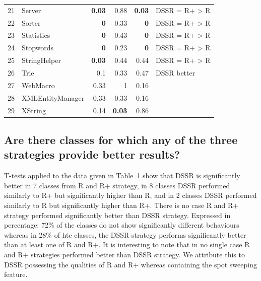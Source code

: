 \documentclass[conference]{IEEEtran}
\begin{document}
\begin{table}[htp]
\begin{tabular}{rlrrrl}
21		&	Server			&	\textbf{0.03}		& 0.88		&\textbf{0.03} 	& DSSR = R+ > R \\
22		&	Sorter			& 	\textbf{0}			& 0.33		&\textbf{0}		& DSSR = R+ > R \\
23		&	Statistics			&	\textbf{0}			& 0.43		&\textbf{0}		& DSSR = R+ > R\\
24		&	Stopwords		&	\textbf{0}			& 0.23		&\textbf{0}		& DSSR = R+ > R \\
25		&	StringHelper		&	\textbf{0.03}		& 0.44		&0.44		& DSSR = R+ > R\\
26		& 	Trie				&	0.1				& 0.33		&0.47		& DSSR better \\
27		&	WebMacro		&	0.33				& 1			&0.16		& \\
28		&	XMLEntityManager	&	0.33				& 0.33		&0.16		& \\
29 		&	XString			&	0.14				&\textbf{0.03}	&0.86		& \\


\end{tabular}
\bigskip
\label{table:ttest}
\end{table}





\subsection{Are there classes for which any of the three strategies provide better results?}


T-tests applied to the data given in Table~\ref{table:ttest} show that DSSR is significantly better in 7 classes from R and R+ strategy, in 8 classes DSSR performed similarly to R+  but significantly higher than R, and in 2 classes DSSR performed similarly to R but significantly higher than R+. There is no case R and R+ strategy performed significantly better than DSSR strategy. Expressed in percentage: 72\%  of the classes do not show significantly different behaviours whereas in 28\% of hte classes, the DSSR strategy performs significantly better than at least one of R and R+. It is interesting to note that in no single case R and R+ strategies performed better than DSSR strategy. We attribute this to DSSR possessing the qualities of R and R+ whereas containing the spot sweeping feature.
\end{document}

